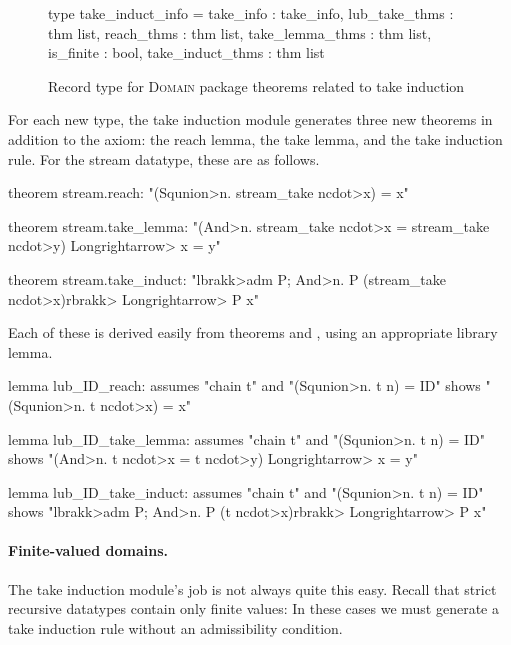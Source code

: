 \begin{figure}
\begin{hscode}
type take_induct_info =
  {
    take_info         : take_info,
    lub_take_thms     : thm list,
    reach_thms        : thm list,
    take_lemma_thms   : thm list,
    is_finite         : bool,
    take_induct_thms  : thm list
  }
\end{hscode}
\caption{Record type for \textsc{Domain} package theorems related to take induction}
\label{fig:domain-take-induct-info}
\end{figure}

For each new type, the take induction module generates three new theorems in addition to the  axiom: the reach lemma, the take lemma, and the take induction rule. For the stream datatype, these are as follows.
%
\begin{isacode}
theorem stream.reach: "(\<Squnion>n. stream_take n\<cdot>x) = x"
\end{isacode}
\unmedskip
{}
\begin{isacode}
theorem stream.take_lemma:
  "(\<And>n. stream_take n\<cdot>x = stream_take n\<cdot>y) \<Longrightarrow> x = y"
\end{isacode}
\unmedskip
{}
\begin{isacode}
theorem stream.take_induct: "\<lbrakk>adm P; \<And>n. P (stream_take n\<cdot>x)\<rbrakk> \<Longrightarrow> P x"
\end{isacode}
%
Each of these is derived easily from theorems  and , using an appropriate library lemma.
%
\begin{isacode}
lemma lub_ID_reach:
  assumes "chain t" and "(\<Squnion>n. t n) = ID"
  shows "(\<Squnion>n. t n\<cdot>x) = x"
\end{isacode}
\unmedskip
{}
\begin{isacode}
lemma lub_ID_take_lemma:
  assumes "chain t" and "(\<Squnion>n. t n) = ID"
  shows "(\<And>n. t n\<cdot>x = t n\<cdot>y) \<Longrightarrow> x = y"
\end{isacode}
\unmedskip
{}
\begin{isacode}
lemma lub_ID_take_induct:
  assumes "chain t" and "(\<Squnion>n. t n) = ID"
  shows "\<lbrakk>adm P; \<And>n. P (t n\<cdot>x)\<rbrakk> \<Longrightarrow> P x"
\end{isacode}

\paragraph{Finite-valued domains.}  The take induction module's job is not always quite this easy. Recall that strict recursive datatypes contain only finite values: In these cases we must generate a take induction rule without an admissibility condition.

